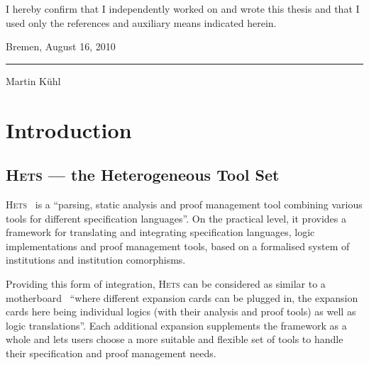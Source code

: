\documentclass[11pt]{article}
\newcommand{\Hets}{\textsc{Hets}}
\begin{document}
\pagestyle{empty}

\cleardoublepage

\begin{titlepage}
  \vspace*{0.5\textheight}
  I hereby confirm that I independently worked on and wrote this thesis and that I used only the references and auxiliary means indicated herein.

  \vfill
  \begin{flushright}
    \begin{minipage}{0.4\textwidth}
      Bremen, August 16, 2010

      \vspace{2cm}
      \rule{\textwidth}{0.5pt}
      \begin{center}
        Martin Kühl
      \end{center}
    \end{minipage}
  \end{flushright}
\end{titlepage}

\cleardoublepage
{}
\pagestyle{plain}

\tableofcontents

\pagebreak
\pagestyle{fancy}


\clearpage
\section{Introduction} %
\label{sec:introduction}

\subsection{\Hets{} --- the Heterogeneous Tool Set}
\label{sub:introduction_hets}

\Hets{}~\cite{Mossakowski:2007} is a ``parsing, static analysis and proof management tool combining various tools for different specification languages''. On the practical level, it provides a framework for translating and integrating specification languages, logic implementations and proof management tools, based on a formalised system of institutions and institution comorphisms.

Providing this form of integration, \Hets{} can be considered as similar to a motherboard~\cite{Codescu:2010} ``where different expansion cards can be plugged in, the expansion cards here being individual logics (with their analysis and proof tools) as well as logic translations''. Each additional expansion supplements the framework as a whole and lets users choose a more suitable and flexible set of tools to handle their specification and proof management needs.
\end{document}
